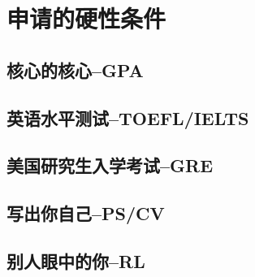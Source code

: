 \chapter{申请的硬性条件}
\newpage
\section{核心的核心--GPA}
\section{英语水平测试--TOEFL/IELTS}
\section{美国研究生入学考试--GRE}
\section{写出你自己--PS/CV}
\section{别人眼中的你--RL}